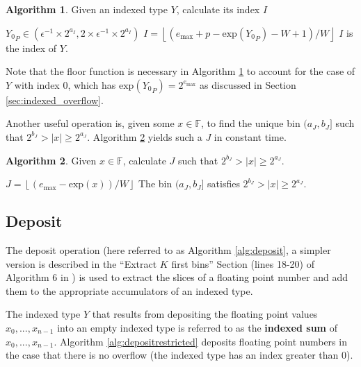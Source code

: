 \documentclass[12pt]{article}
\providecommand{\floor}[1]{\left \lfloor #1 \right \rfloor }
\providecommand{\F}{\ensuremath{\mathbb{F}}}
\providecommand{\exp}{\ensuremath{\text{exp}}}
\providecommand{\max}{\ensuremath{\text{max}}}
\theoremstyle{definition}
\newtheorem{alg}{Algorithm}[section]
\numberwithin{equation}{section}
\numberwithin{figure}{section}
\begin{document}
    \begin{samepage}
    \begin{alg}
      Given an indexed type $Y$, calculate its index $I$
      \begin{algorithmic}[1]
        \Require
          \Statex ${Y_0}_P \in (\epsilon^{-1} \times 2^{a_{I}}, 2 \times \epsilon^{-1} \times 2^{a_I})$
          \State $I = \floor{(e_{\max} + p - \exp({Y_0}_P) - W + 1)/W}$
        \EndFunction
        \Ensure
          \Statex $I$ is the index of $Y$.
      \end{algorithmic}
      \label{alg:iindex}
    \end{alg}
    \end{samepage}

    Note that the floor function is necessary in Algorithm \ref{alg:iindex} to account for the case of $Y$ with index $0$, which has $\exp({Y_0}_P) = 2^{e_{\max}}$ as discussed in Section \ref{sec:indexed_overflow}.

    Another useful operation is, given some $x \in \F$, to find the unique bin $(a_J, b_J]$ such that $2^{b_J} > |x| \geq 2^{a_J}$. Algorithm \ref{alg:index} yields such a $J$ in constant time.

    \begin{samepage}
    \begin{alg}
      Given $x \in \F$, calculate $J$ such that $2^{b_J} > |x| \geq 2^{a_J}$.
      \begin{algorithmic}[1]
          \State $J = \floor{(e_{\max} - \exp(x))/W}$
        \EndFunction
        \Ensure
          \Statex The bin $(a_{J}, b_{J}]$ satisfies $2^{b_{J}} > |x| \geq 2^{a_{J}}$.
      \end{algorithmic}
      \label{alg:index}
    \end{alg}
     \end{samepage}

  \subsection{Deposit}
    \label{sec:primitiveops_deposit}
    The deposit operation (here referred to as Algorithm \ref{alg:deposit}, a simpler version is described in the ``Extract $K$ first bins'' Section (lines 18-20) of Algorithm $6$ in \cite{repsum}) is used to extract the slices of a floating point number and add them to the appropriate accumulators of an indexed type.

    The indexed type $Y$ that results from depositing the floating point values $x_0, ..., x_{n - 1}$ into an empty indexed type is referred to as the \textbf{indexed sum} of $x_0, ..., x_{n - 1}$. Algorithm \ref{alg:depositrestricted} deposits floating point numbers in the case that there is no overflow (the indexed type has an index greater than 0).
\end{document}
